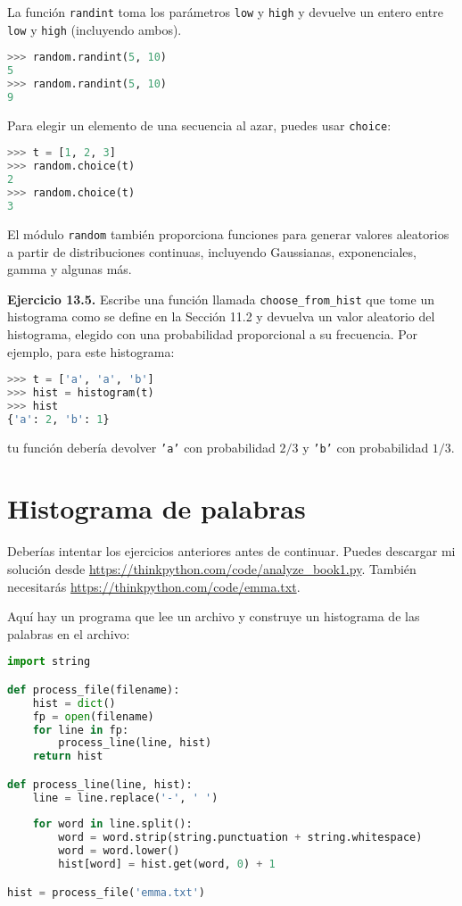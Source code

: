La función \texttt{randint} toma los parámetros \texttt{low} y \texttt{high} y devuelve un entero entre \texttt{low} y \texttt{high} (incluyendo ambos).

\begin{lstlisting}[language=Python]
>>> random.randint(5, 10)
5
>>> random.randint(5, 10)
9
\end{lstlisting}

Para elegir un elemento de una secuencia al azar, puedes usar \texttt{choice}:

\begin{lstlisting}[language=Python]
>>> t = [1, 2, 3]
>>> random.choice(t)
2
>>> random.choice(t)
3
\end{lstlisting}

El módulo \texttt{random} también proporciona funciones para generar valores aleatorios a partir de distribuciones continuas, incluyendo Gaussianas, exponenciales, gamma y algunas más.

\textbf{Ejercicio 13.5.} Escribe una función llamada \texttt{choose\_from\_hist} que tome un histograma como se define en la Sección 11.2 y devuelva un valor aleatorio del histograma, elegido con una probabilidad proporcional a su frecuencia. Por ejemplo, para este histograma:

\begin{lstlisting}[language=Python]
>>> t = ['a', 'a', 'b']
>>> hist = histogram(t)
>>> hist
{'a': 2, 'b': 1}
\end{lstlisting}

tu función debería devolver \texttt{'a'} con probabilidad \(2/3\) y \texttt{'b'} con probabilidad \(1/3\).

\section{Histograma de palabras}

Deberías intentar los ejercicios anteriores antes de continuar. Puedes descargar mi solución desde \url{https://thinkpython.com/code/analyze_book1.py}. También necesitarás \url{https://thinkpython.com/code/emma.txt}.

Aquí hay un programa que lee un archivo y construye un histograma de las palabras en el archivo:

\begin{lstlisting}[language=Python]
import string

def process_file(filename):
    hist = dict()
    fp = open(filename)
    for line in fp:
        process_line(line, hist)
    return hist

def process_line(line, hist):
    line = line.replace('-', ' ')
    
    for word in line.split():
        word = word.strip(string.punctuation + string.whitespace)
        word = word.lower()
        hist[word] = hist.get(word, 0) + 1

hist = process_file('emma.txt')
\end{lstlisting}

